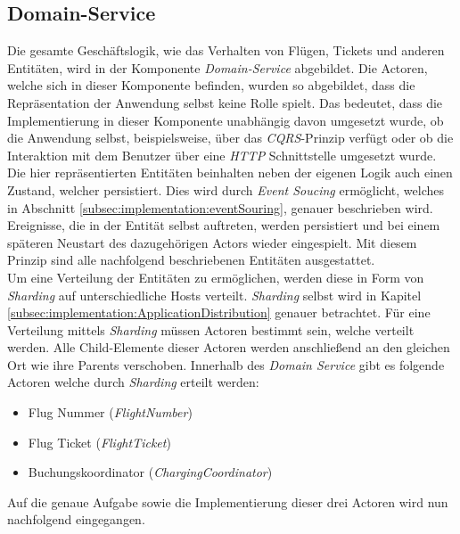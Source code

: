 \subsection{Domain-Service}
\label{subsec:implementation:domainService} 
Die gesamte Geschäftslogik, wie das Verhalten von Flügen, Tickets und anderen Entitäten, wird in der Komponente \textit{Domain-Service}  abgebildet. Die Actoren, welche sich in dieser Komponente befinden, wurden so abgebildet, dass die Repräsentation der Anwendung selbst keine Rolle spielt. Das bedeutet, dass die Implementierung in dieser Komponente unabhängig davon umgesetzt wurde, ob die Anwendung selbst, beispielsweise, über das \textit{CQRS}-Prinzip verfügt oder ob die Interaktion mit dem Benutzer über eine \textit{HTTP} Schnittstelle umgesetzt wurde. \\
% 
% 
Die hier repräsentierten Entitäten beinhalten neben der eigenen Logik auch einen Zustand, welcher persistiert. Dies wird durch \textit{Event Soucing} ermöglicht, welches in Abschnitt \ref{subsec:implementation:eventSouring}, genauer beschrieben wird. Ereignisse, die in der Entität selbst auftreten, werden persistiert und bei einem späteren Neustart des dazugehörigen Actors wieder eingespielt. Mit diesem Prinzip sind alle nachfolgend beschriebenen Entitäten ausgestattet. \\
Um eine Verteilung der Entitäten zu ermöglichen, werden diese in Form von \textit{Sharding} auf unterschiedliche Hosts verteilt. \textit{Sharding} selbst wird in Kapitel \ref{subsec:implementation:ApplicationDistribution} genauer betrachtet. Für eine Verteilung mittels \textit{Sharding} müssen Actoren bestimmt sein, welche verteilt werden. Alle Child-Elemente dieser Actoren werden anschließend an den gleichen Ort wie ihre Parents verschoben. Innerhalb des \textit{Domain Service} gibt es folgende Actoren welche durch \textit{Sharding} erteilt werden:
% 
% 
\begin{itemize}
    \item Flug Nummer (\textit{FlightNumber})
    \item Flug Ticket (\textit{FlightTicket})
    \item Buchungskoordinator (\textit{ChargingCoordinator})
\end{itemize}
Auf die genaue Aufgabe sowie die Implementierung dieser drei Actoren wird nun nachfolgend eingegangen.

